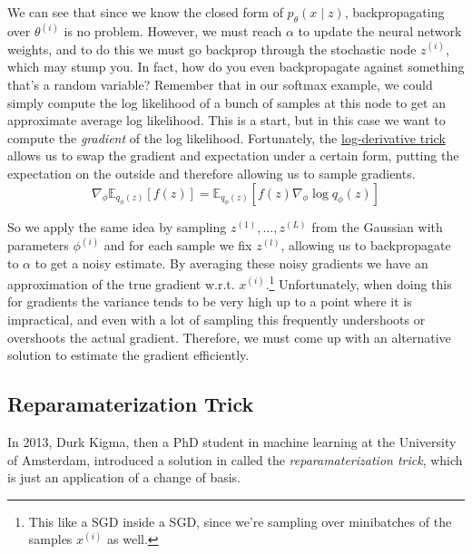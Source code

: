   We can see that since we know the closed form of $p_\theta (x \mid z)$, backpropagating over $\theta^{(i)}$ is no problem. However, we must reach $\alpha$ to update the neural network weights, and to do this we must go backprop through the stochastic node $z^{(i)}$, which may stump you. In fact, how do you even backpropagate against something that's a random variable? Remember that in our softmax example, we could simply compute the log likelihood of a bunch of samples at this node to get an approximate average log likelihood. This is a start, but in this case we want to compute the \textit{gradient} of the log likelihood. Fortunately, the \hyperref[gr-thm:log-derivative-trick]{log-derivative trick} allows us to swap the gradient and expectation under a certain form, putting the expectation on the outside and therefore allowing us to sample gradients. 
  \begin{equation}
    \nabla_\phi \mathbb{E}_{q_\phi (z)} [f(z)] = \mathbb{E}_{q_\phi (z)} [ f(z) \nabla_\phi \log q_{\phi} (z)]
  \end{equation}

  So we apply the same idea by sampling $z^{(1)}, \ldots, z^{(L)}$ from the Gaussian with parameters $\phi^{(i)}$ and for each sample we fix $z^{(l)}$, allowing us to backpropagate to $\alpha$ to get a noisy estimate. By averaging these noisy gradients we have an approximation of the true gradient w.r.t. $x^{(i)}$.\footnote{This like a SGD inside a SGD, since we're sampling over minibatches of the samples $x^{(i)}$ as well.} Unfortunately, when doing this for gradients the variance tends to be very high up to a point where it is impractical, and even with a lot of sampling this frequently undershoots or overshoots the actual gradient. Therefore, we must come up with an alternative solution to estimate the gradient efficiently. 

\subsection{Reparamaterization Trick} 

  In 2013, Durk Kigma, then a PhD student in machine learning at the University of Amsterdam, introduced a solution in \cite{vae} called the \textit{reparamaterization trick}, which is just an application of a change of basis. 

